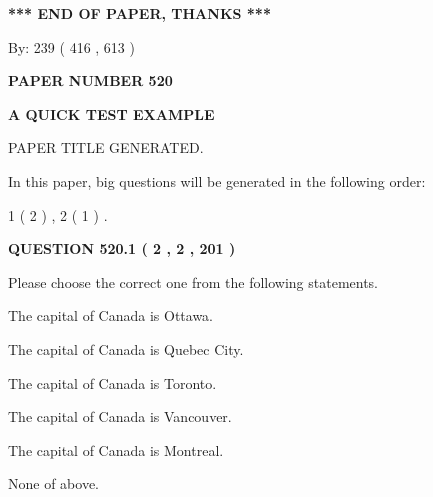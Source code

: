 \documentclass[12pt]{article}
\begin{document}
   
   
   
\vspace{1.0in} 
{\textbf{\large{ *** END OF PAPER, THANKS *** }}} 
   
   
\hspace{1.0in} By: 
 239 ( 416 ,  613 )
   
   
   
   
\newpage 
\setcounter{page}{ 
   520001 } 
   
   
   
   
 {\textbf{ \Large{ PAPER NUMBER  520  }}}
   
   
\vspace{0.2in}
   
   
   
   
   
   
   
   
 \vspace{0.2in}
{\LARGE {\textbf{ A QUICK TEST EXAMPLE}}}
   
   
 PAPER TITLE GENERATED.
   
   
   
\vspace{0.2in}
   
In this paper, big questions will be generated in the following order: 
   
   
   1 ( 2 )
 ,
   2 ( 1 )
 .
  
\vspace{0.2in}
  
{\textbf{\Large{QUESTION
520.1 
 ( 2 , 2 , 201 )
}}}
  
  
Please choose the correct one from the following statements.
 
 
The capital of Canada is Ottawa.
 
 
The capital of Canada is Quebec City.
 
 
The capital of Canada is Toronto.
 
 
The capital of Canada is Vancouver.
 
 
The capital of Canada is Montreal.
 
 
 None of above.
 
 
\noindent{}
 
\end{document}
